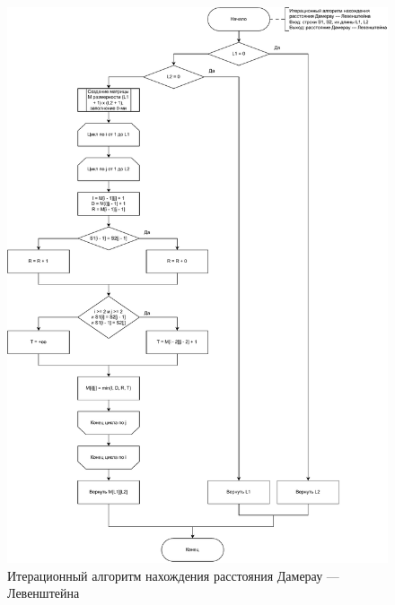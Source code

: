 \begin{figure}[h]
	\centering
	\includegraphics[scale=0.6]{img/dlev_ifm.pdf}
	\caption{Итерационный алгоритм нахождения расстояния Дамерау --- Левенштейна}
	\label{fig:dlifm}
\end{figure}

